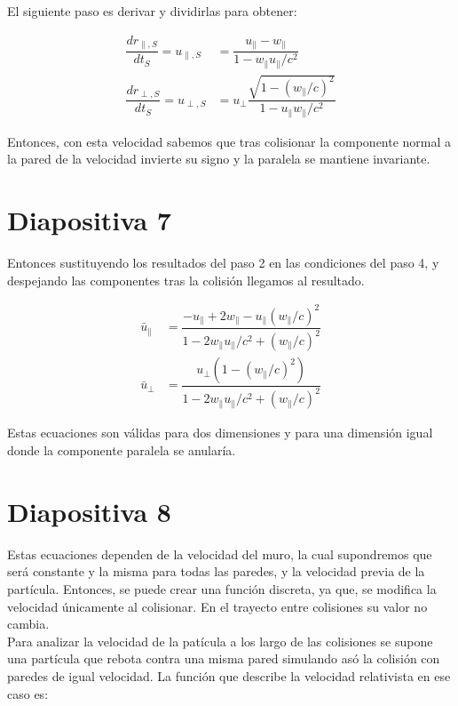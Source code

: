 \documentclass[11pt, spanish]{article}
\begin{document}
El siguiente paso es derivar y dividirlas para obtener:

\begin{align}
    \dfrac{dr_{\parallel, S}}{dt_S} = u_{\parallel,S} &= \dfrac{u_\parallel - w_\parallel}{1 - w_\parallel u_\parallel / c^2} \label{eq:velocity_change1}\\[2mm]
    \dfrac{dr_{\perp, S}}{dt_S} = u_{\perp,S} &= u_\perp\dfrac{\sqrt{1 - {(w_\parallel/c)}^2}}{1 - u_\parallel w_\parallel / c^2} \label{eq:velocity_change2}
\end{align}

Entonces, con esta velocidad sabemos que tras colisionar la componente normal a la pared de la velocidad invierte su signo y la paralela se mantiene invariante. 

\section{Diapositiva 7}

Entonces sustituyendo los resultados del paso 2 en las condiciones del paso 4, y despejando las componentes tras la colisión llegamos al resultado. 

\begin{align}
    \bar{u}_\parallel &= \dfrac{-u_\parallel + 2w_\parallel - u_\parallel(w_\parallel/c)^2}{1 - 2w_\parallel u_\parallel / c^2 + (w_\parallel/c)^2} \label{eq:velocidad_paralela}\\[2mm]
    \bar{u}_\perp &= \dfrac{u_\perp\left(1 - (w_\parallel/c)^2\right)}{1 - 2w_\parallel u_\parallel / c^2 + (w_\parallel/c)^2}\label{eq:velocidad_perpendicular}
\end{align}

Estas ecuaciones son válidas para dos dimensiones y para una dimensión igual donde la componente paralela se anularía. 

\section{Diapositiva 8}

Estas ecuaciones dependen de la velocidad del muro, la cual supondremos que será constante y la misma para todas las paredes, y la velocidad previa de la partícula. Entonces, se puede crear una función discreta, ya que, se modifica la velocidad únicamente al colisionar. En el trayecto entre colisiones su valor no cambia. \\

Para analizar la velocidad de la patícula a los largo de las colisiones se supone una partícula que rebota contra una misma pared simulando asó la colisión con paredes de igual velocidad. La función que describe la velocidad relativista en ese caso es:
\end{document}
